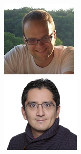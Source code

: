 \documentclass[xcolor=pdftex,dvipsnames,table,mathserif]{beamer}
\begin{document}
{\begin{columns}
  \begin{column}{.2\textwidth}
\vfill
\includegraphics[width=\textwidth]{Thomas_Walter_Heidelberg.jpg}\\
\vspace{2em}
    \includegraphics[width=\textwidth]{velascoforero}\\

\end{column}
\end{columns}}
\end{document}
